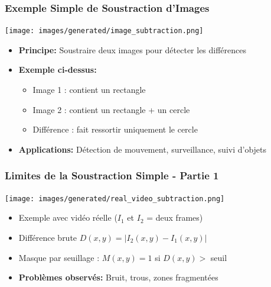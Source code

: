 \documentclass{beamer}
\begin{document}
\begin{frame}
    \frametitle{Exemple Simple de Soustraction d'Images}
    \begin{center}
        \texttt{[image: images/generated/image\_subtraction.png]}
    \end{center}
    \begin{itemize}
        \item \textbf{Principe:} Soustraire deux images pour détecter les différences
        \item \textbf{Exemple ci-dessus:}
        \begin{itemize}
            \item Image 1 : contient un rectangle
            \item Image 2 : contient un rectangle + un cercle
            \item Différence : fait ressortir uniquement le cercle
        \end{itemize}
        \item \textbf{Applications:} Détection de mouvement, surveillance, suivi d'objets
    \end{itemize}
\end{frame}

\begin{frame}
    \frametitle{Limites de la Soustraction Simple - Partie 1}
    \begin{center}
        \texttt{[image: images/generated/real\_video\_subtraction.png]}
    \end{center}
    \begin{itemize}
        \item Exemple avec vidéo réelle ($I_{1}$ et $I_{2}$ = deux frames)
        \item Différence brute $D(x,y) = |I_{2}(x,y) - I_{1}(x,y)|$
        \item Masque par seuillage : $M(x,y) = 1$ si $D(x,y) >$ seuil
        \item \textbf{Problèmes observés:} Bruit, trous, zones fragmentées
    \end{itemize}
\end{frame}
\end{document}
